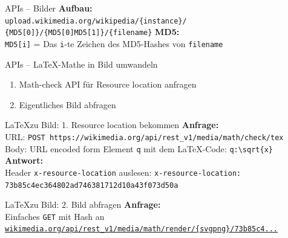 \documentclass[9pt]{beamer}
\begin{document}
	\begin{frame}{APIs -- Bilder}
		\textbf{Aufbau:}\\
		\texttt{upload.wikimedia.org/wikipedia/\{instance\}/}
		\texttt{\{MD5[0]\}/\{MD5[0]MD5[1]\}/\{filename\}}
		\n
		\textbf{MD5:}\\
		\texttt{MD5[i]} = Das \texttt{i}-te Zeichen des MD5-Hashes von \texttt{filename}
	\end{frame}

	\begin{frame}{APIs -- \LaTeX-Mathe in Bild umwandeln}
		\begin{enumerate}
			\item Math-check API für Resource location anfragen
			\item Eigentliches Bild abfragen
		\end{enumerate}
	\end{frame}

	\begin{frame}[fragile]{\LaTeX zu Bild: 1. Resource location bekommen}
		\textbf{Anfrage:}\\
		URL: \texttt{POST https://wikimedia.org/api/rest\_v1/media/math/check/tex}\\
		Body: URL encoded form Element \texttt{q} mit dem \LaTeX-Code:\n
		\verb+q:\sqrt{x}+
		\n
		\textbf{Antwort:}\\
		Header \texttt{x-resource-location} auslesen:\n
		\texttt{x-resource-location: 73b85c4ec364802ad746381712d10a43f073d50a}
	\end{frame}

	\begin{frame}[fragile]{\LaTeX zu Bild: 2. Bild abfragen}
		\textbf{Anfrage:}\\
		Einfaches \texttt{GET} mit Hash an\n
		\href{https://wikimedia.org/api/rest_v1/media/math/render/svg/73b85c4ec364802ad746381712d10a43f073d50a}{\texttt{wikimedia.org/api/rest\_v1/media/math/render/\{svg\textbar png\}/73b85c4...}}
	\end{frame}
		
	
	
	
	
	
\end{document}
